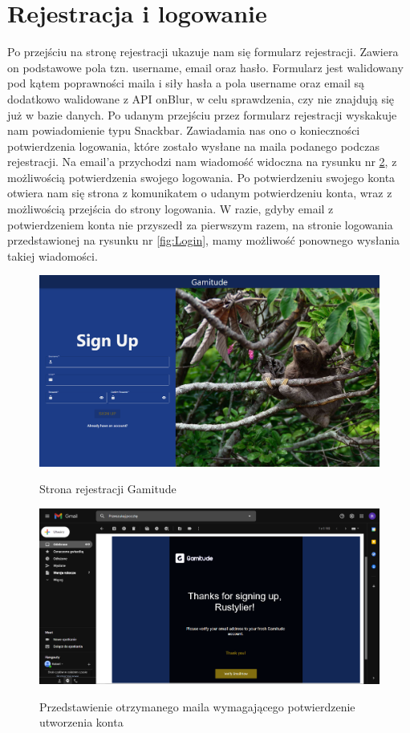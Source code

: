 \documentclass[a4paper,11pt]{report}
\begin{document}
\section{Rejestracja i logowanie}
Po przejściu na stronę rejestracji ukazuje nam się formularz rejestracji. Zawiera on podstawowe pola tzn. username, email oraz hasło.
Formularz jest walidowany pod kątem poprawności maila i siły hasła
 a pola username oraz email są dodatkowo walidowane z API onBlur, w celu sprawdzenia, czy nie znajdują się już w bazie danych. 
Po udanym przejściu przez formularz rejestracji wyskakuje nam powiadomienie typu Snackbar. 
Zawiadamia nas ono o konieczności potwierdzenia logowania, które zostało wysłane na maila podanego podczas rejestracji.
Na email'a przychodzi nam wiadomość widoczna na rysunku nr \ref{fig:Email}, z możliwością potwierdzenia swojego logowania.
Po potwierdzeniu swojego konta otwiera nam się strona z komunikatem o udanym potwierdzeniu konta, wraz z możliwością przejścia do strony logowania.
W razie, gdyby email z potwierdzeniem konta nie przyszedł za pierwszym razem,
 na stronie logowania przedstawionej na rysunku nr \ref{fig:Login}, mamy możliwość ponownego wysłania takiej wiadomości.
\begin{figure}[H]
	\centering
	\includegraphics[scale=0.3]{prezentacja/Register}\\
	\caption{Strona rejestracji Gamitude}
	\label{fig:Register}
\end{figure}
\begin{figure}[H]
	\centering
	\includegraphics[scale=0.3]{prezentacja/Email}\\
	\caption{Przedstawienie otrzymanego maila wymagającego potwierdzenie utworzenia konta}
	\label{fig:Email}
\end{figure}
\end{document}
